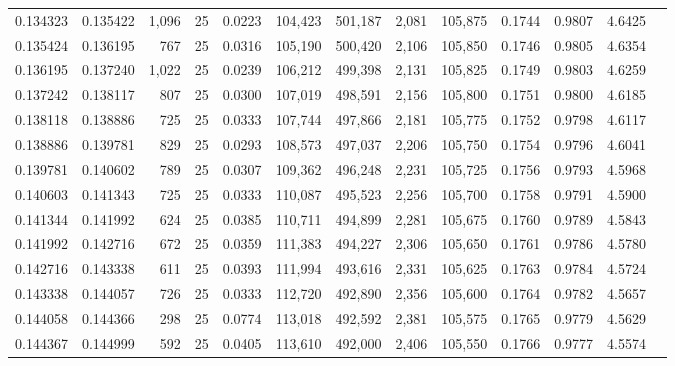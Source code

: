 \begin{tabular}{rrrrrrrrrrrrr}
0.134323 & 0.135422 & 1,096 &  25 &                                     0.0223 & 104,423 & 501,187 &   2,081 & 105,875 & 0.1744 & 0.9807 & 4.6425 \\
0.135424 & 0.136195 &   767 &  25 &                                     0.0316 & 105,190 & 500,420 &   2,106 & 105,850 & 0.1746 & 0.9805 & 4.6354 \\
0.136195 & 0.137240 & 1,022 &  25 &                                     0.0239 & 106,212 & 499,398 &   2,131 & 105,825 & 0.1749 & 0.9803 & 4.6259 \\
0.137242 & 0.138117 &   807 &  25 &                                     0.0300 & 107,019 & 498,591 &   2,156 & 105,800 & 0.1751 & 0.9800 & 4.6185 \\
0.138118 & 0.138886 &   725 &  25 &                                     0.0333 & 107,744 & 497,866 &   2,181 & 105,775 & 0.1752 & 0.9798 & 4.6117 \\
0.138886 & 0.139781 &   829 &  25 &                                     0.0293 & 108,573 & 497,037 &   2,206 & 105,750 & 0.1754 & 0.9796 & 4.6041 \\
0.139781 & 0.140602 &   789 &  25 &                                     0.0307 & 109,362 & 496,248 &   2,231 & 105,725 & 0.1756 & 0.9793 & 4.5968 \\
0.140603 & 0.141343 &   725 &  25 &                                     0.0333 & 110,087 & 495,523 &   2,256 & 105,700 & 0.1758 & 0.9791 & 4.5900 \\
0.141344 & 0.141992 &   624 &  25 &                                     0.0385 & 110,711 & 494,899 &   2,281 & 105,675 & 0.1760 & 0.9789 & 4.5843 \\
0.141992 & 0.142716 &   672 &  25 &                                     0.0359 & 111,383 & 494,227 &   2,306 & 105,650 & 0.1761 & 0.9786 & 4.5780 \\
0.142716 & 0.143338 &   611 &  25 &                                     0.0393 & 111,994 & 493,616 &   2,331 & 105,625 & 0.1763 & 0.9784 & 4.5724 \\
0.143338 & 0.144057 &   726 &  25 &                                     0.0333 & 112,720 & 492,890 &   2,356 & 105,600 & 0.1764 & 0.9782 & 4.5657 \\
0.144058 & 0.144366 &   298 &  25 &                                     0.0774 & 113,018 & 492,592 &   2,381 & 105,575 & 0.1765 & 0.9779 & 4.5629 \\
0.144367 & 0.144999 &   592 &  25 &                                     0.0405 & 113,610 & 492,000 &   2,406 & 105,550 & 0.1766 & 0.9777 & 4.5574 \\

\end{tabular}
